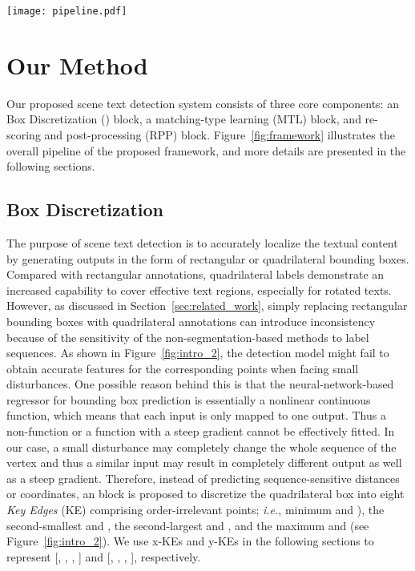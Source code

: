  
\begin{figure*}[t!]
  \centering
  \texttt{[image: pipeline.pdf]}
  \caption{Overview of the proposed detection framework.}
  \label{fig:framework}
\end{figure*}

\section{Our Method}

Our proposed scene text detection system consists of three core components: an \Orderless Box Discretization (\Ours) block, a matching-type learning (MTL) block, and re-scoring and post-processing (RPP) block. Figure~\ref{fig:framework} illustrates the overall pipeline of the proposed framework, and more details are presented in the following sections.

\subsection{ \Orderless Box Discretization}
\label{sec:module}

The purpose of \multioriented scene text detection is to accurately localize the textual content by generating outputs in the form of rectangular or quadrilateral bounding boxes. Compared with rectangular annotations, quadrilateral labels demonstrate an increased capability to cover effective text regions, especially for rotated texts. However, as discussed in Section~\ref{sec:related_work}, simply replacing rectangular bounding boxes with quadrilateral annotations can introduce inconsistency because of the sensitivity of the non-segmentation-based methods to label sequences. As shown in Figure~\ref{fig:intro_2}, the detection model might fail to obtain accurate features for the corresponding points when facing small disturbances. One possible reason behind this is that the neural-network-based regressor for bounding box prediction is essentially a nonlinear continuous function, which means that each input is only mapped to one output. Thus a non-function or a function with a steep gradient cannot be effectively fitted. In our case, a small disturbance may completely change the whole sequence of the vertex and thus a similar input may result in completely different output as well as a steep gradient. Therefore, instead of predicting sequence-sensitive distances or coordinates, an \Ours block is proposed to discretize the quadrilateral box into eight \textit{Key Edges} (KE) comprising order-irrelevant points;
\emph{i.e.}, minimum  and ), the second-smallest  and , the second-largest  and , and the maximum  and  (see Figure~\ref{fig:intro_2}). We use x-KEs and y-KEs in the following sections to represent [, , , ] and [, , , ], respectively.

